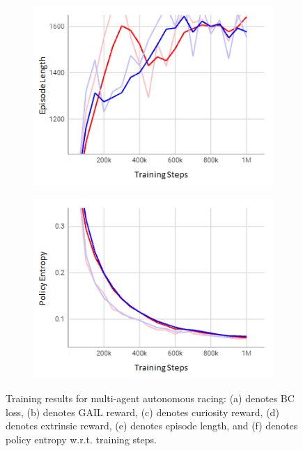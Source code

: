 \documentclass[letterpaper, 10 pt, conference]{ieeeconf}  %
\begin{document}
\begin{figure}[t]
\begin{subfigure}[b]{0.16\linewidth}
			\includegraphics[width=\linewidth]{Fig9e.png}
			\caption{}
			\label{fig9e}
		\end{subfigure}
		\hfill
		\begin{subfigure}[b]{0.16\linewidth}
			\centering
			\includegraphics[width=\linewidth]{Fig9f.png}
			\caption{}
			\label{fig9f}
		\end{subfigure}
		\caption{Training results for multi-agent autonomous racing: (a) denotes BC loss, (b) denotes GAIL reward, (c) denotes curiosity reward, (d) denotes extrinsic reward, (e) denotes episode length, and (f) denotes policy entropy w.r.t. training steps.}
		\label{fig9}
	\end{figure}
	
\end{document}
